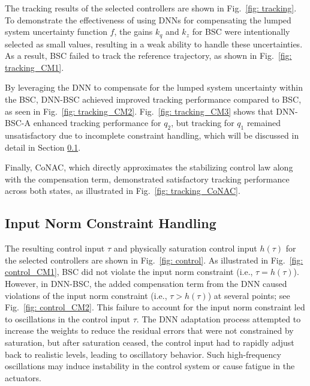 \documentclass[lettersize,journal]{IEEEtran}
\begin{document}
The tracking results of the selected controllers are shown in Fig.~\ref{fig: tracking}.
To demonstrate the effectiveness of using DNNs for compensating the lumped system uncertainty function $f$, the gains ${k_q}$ and ${k_z}$ for BSC were intentionally selected as small values, resulting in a weak ability to handle these uncertainties. As a result,
BSC failed to track the reference trajectory, as shown in Fig.~\ref{fig: tracking_CM1}.

By leveraging the DNN to compensate for the lumped system uncertainty within the BSC, DNN-BSC achieved improved tracking performance compared to BSC, as seen in Fig.~\ref{fig: tracking_CM2}. Fig.~\ref{fig: tracking_CM3} shows that DNN-BSC-A enhanced tracking performance for $q_2$, but tracking for $q_1$ remained unsatisfactory due to incomplete constraint handling, which will be discussed in detail in Section \ref{sec:sim_cnst}.

Finally, CoNAC, which directly approximates the stabilizing control law along with the compensation term, demonstrated satisfactory tracking performance across both states, as illustrated in Fig.~\ref{fig: tracking_CoNAC}.

\subsection{Input Norm Constraint Handling}\label{sec:sim_cnst}

The resulting control input $\tau$ and physically saturation control input $h(\tau)$ for the selected controllers are shown in Fig.~\ref{fig: control}. As illustrated in Fig.~\ref{fig: control_CM1}, BSC did not violate the input norm constraint (i.e., $\tau = h(\tau)$). However, in DNN-BSC, the added compensation term from the DNN caused violations of the input norm constraint (i.e., $\tau > h(\tau)$) at several points; see Fig.~\ref{fig: control_CM2}. This failure to account for the input norm constraint led to oscillations in the control input $\tau$. The DNN adaptation process attempted to increase the weights to reduce the residual errors that were not constrained by saturation, but after saturation ceased, the control input had to rapidly adjust back to realistic levels, leading to oscillatory behavior. Such high-frequency oscillations may induce instability in the control system or cause fatigue in the actuators.
\end{document}
